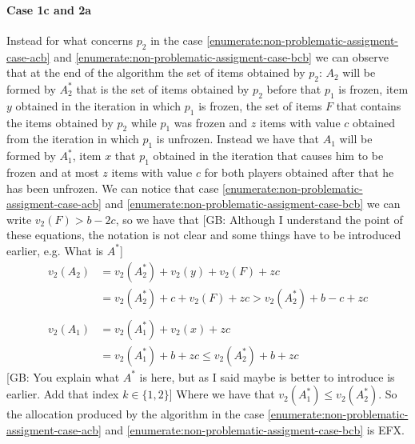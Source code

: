\documentclass{article}
\newcommand{\gb}[1]{{\color{red}[GB: #1]}}
\begin{document}
\paragraph{Case 1c and 2a}
Instead for what concerns $p_2$ in the case \ref{enumerate:non-problematic-assigment-case-acb} and \ref{enumerate:non-problematic-assigment-case-bcb} we can observe that at the end of the algorithm the set of items obtained by $p_2$: $A_2$ will be formed by $A_2^*$ that is the set of items obtained by $p_2$ before that $p_1$ is frozen, item $y$ obtained in the iteration in which $p_1$ is frozen, the set of items $F$ that contains the items obtained by $p_2$ while $p_1$ was frozen and $z$ items with value $c$ obtained from the iteration in which $p_1$ is unfrozen. Instead we have that $A_1$ will be formed by $A_1^*$, item $x$ that $p_1$ obtained in the iteration that causes him to be frozen and at most $z$ items with value $c$ for both players obtained after that he has been unfrozen. We can notice that case  \ref{enumerate:non-problematic-assigment-case-acb} and \ref{enumerate:non-problematic-assigment-case-bcb} we can write $v_2(F) > b-2c$, so we have that 
\gb{Although I understand the point of these equations, the notation is not clear and some things have to be introduced earlier, e.g. What is $A^*$}
\begin{align*}
    v_2(A_2) &= v_2(A_2^*) + v_2(y) + v_2(F) + zc\\
    &= v_2(A_2^*) + c + v_2(F) + zc > v_2(A_2^*) + b-c + zc\\
    \\
    v_2(A_1) &= v_2(A_1^*) + v_2(x) + zc\\
    &=v_2(A_1^*) + b + zc\le v_2(A_2^*) + b + zc
\end{align*}
\gb{You explain what $A^*$ is here, but as I said maybe is better to introduce is earlier. Add that index $k \in \{1,2\}$}
Where we have that $v_2(A_1^*)\le v_2(A_2^*)$.
So the allocation produced by the algorithm in the case \ref{enumerate:non-problematic-assigment-case-acb} and \ref{enumerate:non-problematic-assigment-case-bcb} is EFX.
\end{document}
